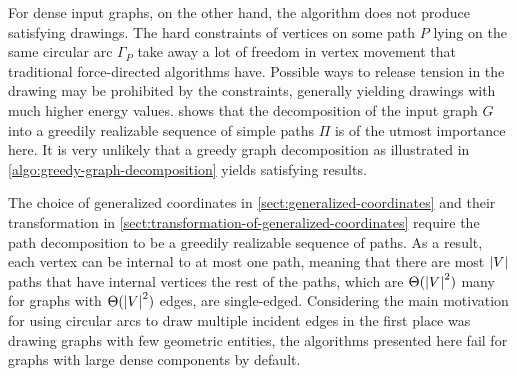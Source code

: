 For dense input graphs, on the other hand, the algorithm does not produce satisfying drawings. The hard constraints of vertices on some path ${P}$ lying on the same circular arc ${\Gamma_P}$ take away a lot of freedom in vertex movement that traditional force-directed algorithms have. Possible ways to release tension in the drawing may be prohibited by the constraints, generally yielding drawings with much higher energy values.  shows that the decomposition of the input graph ${G}$ into a greedily realizable sequence of simple paths ${\Pi}$ is of the utmost importance here. It is very unlikely that a greedy graph decomposition as illustrated in \cref{algo:greedy-graph-decomposition} yields satisfying results.

The choice of generalized coordinates in \cref{sect:generalized-coordinates} and their transformation in \cref{sect:transformation-of-generalized-coordinates} require the path decomposition to be a greedily realizable sequence of paths. As a result, each vertex can be internal to at most one path, meaning that there are most ${\left\lvert V\right\rvert}$ paths that have internal vertices \emdash the rest of the paths, which are ${\Theta(\left\lvert V\right\rvert^2)}$ many for graphs with ${\Theta(\left\lvert V\right\rvert^2)}$ edges, are single-edged. Considering the main motivation for using circular arcs to draw multiple incident edges in the first place was drawing graphs with few geometric entities, the algorithms presented here fail for graphs with large dense components by default.
